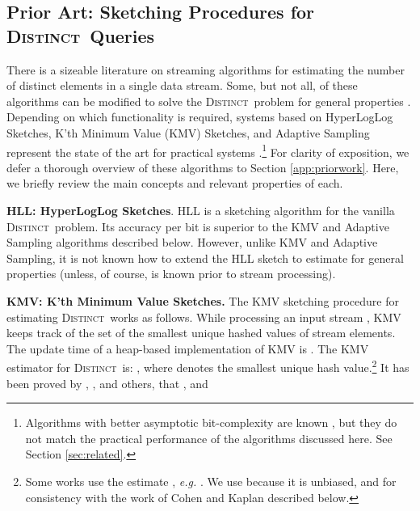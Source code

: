 \documentclass{article}
\newcommand{\eat}[1]{}
\newcommand{\distinctP}{\textsc{Distinct}}
\newcommand{\distinct}{\textsc{Distinct}}
\newcommand{\distinctA}{\textsc{Distinct}}
\begin{document}
\eat{\medskip
\noindent \textbf{Additional Notation.} Throughout, we will use the following strategy for simplifying the
presentation of our results. Let  be an arbitrary stream that is allowed to contain multiple
occurrences of the various identifiers. Let  be the stream derived from  by deleting all
occurrences of each label except for the one that would be encountered first during 
a linear scan through . Then every sketching algorithm that we consider
produces exactly the same sketch and exactly the same estimate whether it is applied to
 or to . 
Therefore, without loss of generality, all of our proofs concerning the contents of sketches and the values
of estimates will be written in terms of the ``uniquified'' stream . 
Finally, the notation  will always refer to the sequence of hash values obtained by mapping 
a hash function  over a length- uniquified stream .}

\subsection{Prior Art: Sketching Procedures for \distinct\ Queries}
\label{sec:priorwork}
There is a sizeable literature on streaming algorithms for estimating the number of distinct elements in a single data stream. Some, but not all,
of these algorithms can be modified to solve the \distinctP\ problem for general properties . 
Depending on which functionality is required, systems based on HyperLogLog Sketches, 
K'th Minimum Value (KMV) Sketches, and Adaptive Sampling represent the
state of the art for practical systems \cite{heule2013hll}.\footnote{Algorithms with better asymptotic bit-complexity are known \cite{kane2010optimal}, but they do not match the practical
performance of the algorithms discussed here. See Section \ref{sec:related}.}
For clarity of exposition, we defer a thorough overview of these algorithms to Section \ref{app:priorwork}. Here, we briefly review the main concepts
and relevant properties of each. 

\medskip
\noindent \textbf{HLL: HyperLogLog Sketches}. HLL is a sketching algorithm for the vanilla \distinct\ problem. Its accuracy per bit is superior to the KMV and Adaptive Sampling algorithms described below.
However, unlike KMV and Adaptive Sampling, it is not known how to extend the HLL sketch to estimate  for general properties  (unless, of course,  is known prior to stream
processing). 


\medskip
\noindent \textbf{KMV: K'th Minimum Value Sketches.} The KMV sketching procedure for estimating \distinctA\ works as follows. While processing an input stream , KMV keeps track of the set  of the  smallest unique hashed values of stream elements.
The update time of a heap-based implementation of KMV is .
The KMV estimator for \distinctA\ is: 
, where 
 denotes the  smallest unique 
hash value.\footnote{Some works use the estimate , 
{\em e.g.} 
\cite{bar2002counting}. 
We use  
because it is unbiased, and
for consistency with the work of Cohen and Kaplan \cite{cohen2009leveraging} described below.}
It has been proved by \cite{beyer2009distinct}, \cite{giroire2009order}, and others, that , and
\end{document}
